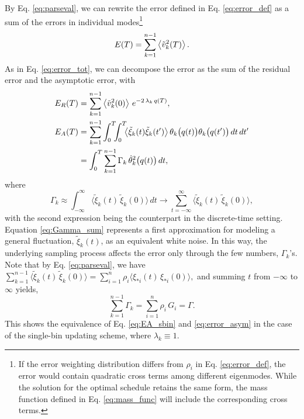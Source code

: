 \documentclass[preprint, superscriptaddress, floatfix]{revtex4-1}
\newcommand{\Err}{E}
\begin{document}
By Eq. \eqref{eq:parseval},
we can rewrite the error defined in Eq. \eqref{eq:error_def} as
a sum of the errors in individual modes\footnote{If
the error weighting distribution differs from $\rho_i$
in Eq. \eqref{eq:error_def},
the error would contain quadratic cross terms among different eigenmodes.
%
While the solution for the optimal schedule retains the same form,
the mass function defined in Eq. \eqref{eq:mass_func}
will include the corresponding cross terms.
}
%
\begin{align}
  \Err(T)
  =
  \sum_{k = 1}^{n - 1}
    \left\langle
      {\tilde v}_k^2(T)
    \right\rangle
  .
  \notag
\end{align}
%
As in Eq. \eqref{eq:error_tot},
we can decompose the error as the sum
of the residual error and the asymptotic error, with
\begin{align}
  \Err_R(T)
  &=
  \sum_{k = 1}^{n-1}
    \left\langle
      {\tilde v}_k^2(0)
    \right\rangle \,
    e^{ - 2 \, \lambda_k  \, q(T) }
  ,
  \label{eq:error_res}
  \\
  \Err_A(T)
  &=
  \sum_{k=1}^{n-1}
  \int_0^T\!\!\!\int_0^T
  \!\!
  \bigl\langle
    \tilde\xi_k(t)
    \tilde\xi_k(t')
  \bigr\rangle \,
  \theta_k\bigl(q(t)\bigr)
  \theta_k\bigl(q(t')\bigr)
  \, dt \, dt'
  \notag \\
  &=
  \int_0^T
  \sum_{k = 1}^{n-1}
  \Gamma_k \, \dot \theta_k^2\bigl( q(t) \bigr) \, dt
  ,
  \label{eq:error_asym}
\end{align}
%
where
%
%
\begin{equation}
  \Gamma_k
  \approx
  \int_{-\infty}^\infty
  \bigl\langle
    \tilde\xi_k(t) \, \tilde\xi_k(0)
  \bigr\rangle
  \, dt
  \to
  \sum_{t = -\infty}^\infty
  \bigl\langle
    \tilde\xi_k(t) \, \tilde\xi_k(0)
  \bigr\rangle
  ,
  \label{eq:Gamma_sum}
\end{equation}
%
with the second expression being
the counterpart in the discrete-time setting.
%
Equation \eqref{eq:Gamma_sum} represents
a first approximation for modeling
a general fluctuation, ${\tilde \xi}_k(t)$,
as an equivalent white noise.
%
In this way,
the underlying sampling process
affects the error only through the
few numbers, $\Gamma_k$'s.
%
Note that by Eq. \eqref{eq:parseval}, we have
$\sum_{k=1}^{n-1} \bigl\langle {\tilde \xi}_k(t) \, {\tilde \xi}_k(0) \bigr\rangle
= \sum_{i=1}^n \rho_i \bigl\langle \xi_{*i}(t) \, \xi_{*i}(0) \bigr\rangle,$
and summing $t$ from $-\infty$ to $\infty$ yields,
\begin{equation}
  \sum_{k=1}^{n-1} \Gamma_k = \sum_{i=1}^n \rho_i \, G_i = \Gamma
  .
  \label{eq:Gammak_sum}
\end{equation}
This shows the equivalence of
Eq. \eqref{eq:EA_sbin} and \eqref{eq:error_asym}
in the case of the single-bin updating scheme, where $\lambda_k \equiv 1$.
%
\end{document}
